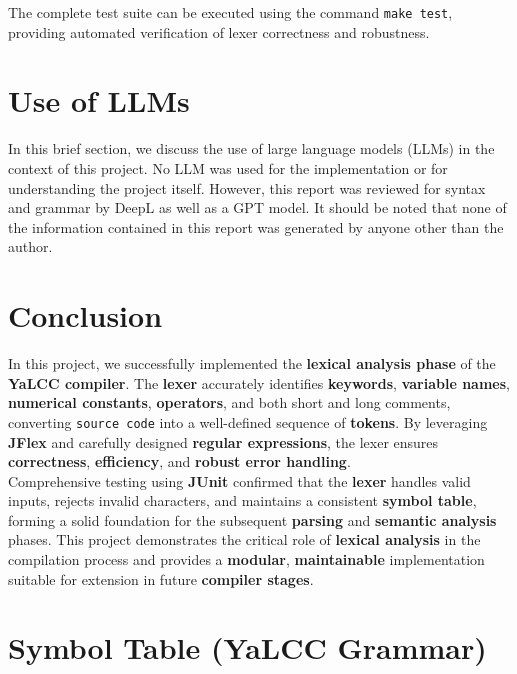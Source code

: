 \documentclass{article}
\begin{document}
\noindent The complete test suite can be executed using the command \texttt{make test}, providing automated verification of lexer correctness and robustness.

\section{Use of LLMs}

\noindent In this brief section, we discuss the use of large language models (LLMs) in the context of this project. No LLM was used for the implementation or for understanding the project itself. However, this report was reviewed for syntax and grammar by DeepL as well as a GPT model. It should be noted that none of the information contained in this report was generated by anyone other than the author.

\section{Conclusion}

\noindent In this project, we successfully implemented the \textbf{lexical analysis phase} of the \textbf{YaLCC compiler}. The \textbf{lexer} accurately identifies \textbf{keywords}, \textbf{variable names}, \textbf{numerical constants}, \textbf{operators}, and both short and long comments, converting \texttt{source code} into a well-defined sequence of \textbf{tokens}. By leveraging \textbf{JFlex} and carefully designed \textbf{regular expressions}, the lexer ensures \textbf{correctness}, \textbf{efficiency}, and \textbf{robust error handling}. \\

\noindent Comprehensive testing using \textbf{JUnit} confirmed that the \textbf{lexer} handles valid inputs, rejects invalid characters, and maintains a consistent \textbf{symbol table}, forming a solid foundation for the subsequent \textbf{parsing} and \textbf{semantic analysis} phases. This project demonstrates the critical role of \textbf{lexical analysis} in the compilation process and provides a \textbf{modular}, \textbf{maintainable} implementation suitable for extension in future \textbf{compiler stages}.

\newpage

\appendix
\renewcommand{\thesection}{\Alph{section}}
\section{Symbol Table (YaLCC Grammar)}
\label{appendix:symbol-table}
\end{document}
